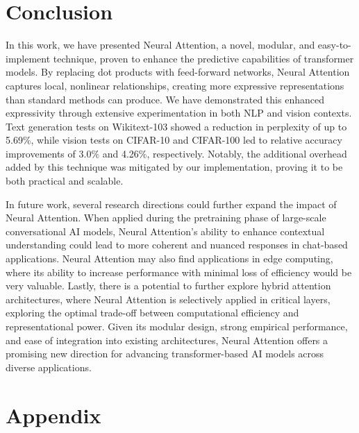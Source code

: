 \documentclass{article}
\begin{document}
\section{Conclusion}
\label{sec:conclusion}
In this work, we have presented Neural Attention, a novel, modular, and easy-to-implement technique, proven to enhance the predictive capabilities of transformer models. By replacing dot products with feed-forward networks, Neural Attention captures local, nonlinear relationships, creating more expressive representations than standard methods can produce. We have demonstrated this enhanced expressivity through extensive experimentation in both NLP and vision contexts. Text generation tests on Wikitext-103 showed a reduction in perplexity of up to 5.69\%, while vision tests on CIFAR-10 and CIFAR-100 led to relative accuracy improvements of 3.0\% and 4.26\%, respectively. Notably, the additional overhead added by this technique was mitigated by our implementation, proving it to be both practical and scalable.

In future work, several research directions could further expand the impact of Neural Attention. When applied during the pretraining phase of large-scale conversational AI models, Neural Attention’s ability to enhance contextual understanding could lead to more coherent and nuanced responses in chat-based applications. Neural Attention may also find applications in edge computing, where its ability to increase performance with minimal loss of efficiency would be very valuable. Lastly, there is a potential to further explore hybrid attention architectures, where Neural Attention is selectively applied in critical layers, exploring the optimal trade-off between computational efficiency and representational power. Given its modular design, strong empirical performance, and ease of integration into existing architectures, Neural Attention offers a promising new direction for advancing transformer-based AI models across diverse applications.





%
\appendix

\section*{Appendix}
\end{document}
